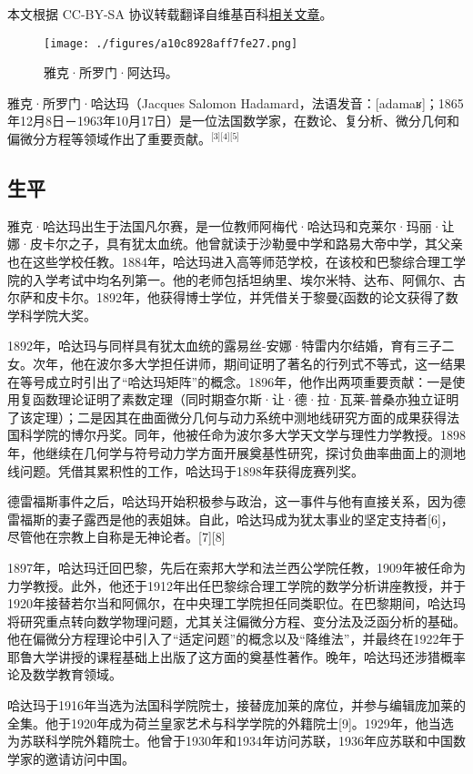 
本文根据 CC-BY-SA 协议转载翻译自维基百科\href{https://en.wikipedia.org/wiki/Jacques_Hadamard}{相关文章}。

\begin{figure}[ht]
\centering
\texttt{[image: ./figures/a10c8928aff7fe27.png]}
\caption{雅克·所罗门·阿达玛。} \label{fig_YKadm_1}
\end{figure}
雅克·所罗门·哈达玛（Jacques Salomon Hadamard，法语发音：[adamaʁ]；1865年12月8日－1963年10月17日）是一位法国数学家，在数论、复分析、微分几何和偏微分方程等领域作出了重要贡献。\(^\text{[3][4][5]}\)
\subsection{生平}
雅克·哈达玛出生于法国凡尔赛，是一位教师阿梅代·哈达玛和克莱尔·玛丽·让娜·皮卡尔之子，具有犹太血统。他曾就读于沙勒曼中学和路易大帝中学，其父亲也在这些学校任教。1884年，哈达玛进入高等师范学校，在该校和巴黎综合理工学院的入学考试中均名列第一。他的老师包括坦纳里、埃尔米特、达布、阿佩尔、古尔萨和皮卡尔。1892年，他获得博士学位，并凭借关于黎曼ζ函数的论文获得了数学科学院大奖。

1892年，哈达玛与同样具有犹太血统的露易丝-安娜·特雷内尔结婚，育有三子二女。次年，他在波尔多大学担任讲师，期间证明了著名的行列式不等式，这一结果在等号成立时引出了“哈达玛矩阵”的概念。1896年，他作出两项重要贡献：一是使用复函数理论证明了素数定理（同时期查尔斯·让·德·拉·瓦莱-普桑亦独立证明了该定理）；二是因其在曲面微分几何与动力系统中测地线研究方面的成果获得法国科学院的博尔丹奖。同年，他被任命为波尔多大学天文学与理性力学教授。1898年，他继续在几何学与符号动力学方面开展奠基性研究，探讨负曲率曲面上的测地线问题。凭借其累积性的工作，哈达玛于1898年获得庞赛列奖。

德雷福斯事件之后，哈达玛开始积极参与政治，这一事件与他有直接关系，因为德雷福斯的妻子露西是他的表姐妹。自此，哈达玛成为犹太事业的坚定支持者[6]，尽管他在宗教上自称是无神论者。[7][8]

1897年，哈达玛迁回巴黎，先后在索邦大学和法兰西公学院任教，1909年被任命为力学教授。此外，他还于1912年出任巴黎综合理工学院的数学分析讲座教授，并于1920年接替若尔当和阿佩尔，在中央理工学院担任同类职位。在巴黎期间，哈达玛将研究重点转向数学物理问题，尤其关注偏微分方程、变分法及泛函分析的基础。他在偏微分方程理论中引入了“适定问题”的概念以及“降维法”，并最终在1922年于耶鲁大学讲授的课程基础上出版了这方面的奠基性著作。晚年，哈达玛还涉猎概率论及数学教育领域。

哈达玛于1916年当选为法国科学院院士，接替庞加莱的席位，并参与编辑庞加莱的全集。他于1920年成为荷兰皇家艺术与科学学院的外籍院士[9]。1929年，他当选为苏联科学院外籍院士。他曾于1930年和1934年访问苏联，1936年应苏联和中国数学家的邀请访问中国。

